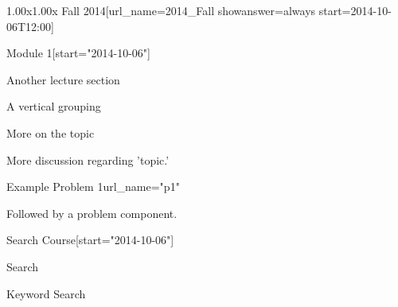 \documentclass[12pt]{article}
\begin{document}
\begin{edXcourse}{1.00x}{1.00x Fall 2014}[url_name=2014_Fall showanswer=always start=2014-10-06T12:00]
\begin{edXchapter}{Module 1}[start="2014-10-06"]
\begin{edXsequential}{Another lecture section}
\begin{edXvertical}{A vertical grouping}
\begin{edXtext}{More on the topic}

More discussion regarding 'topic.'

\end{edXtext}

\begin{edXproblem}{Example Problem 1}{url_name="p1"}

Followed by a problem component.

\end{edXproblem}

\end{edXvertical}

\end{edXsequential}

\end{edXchapter}

\begin{edXchapter}{Search Course}[start="2014-10-06"]

\begin{edXsequential}{Search}

\begin{edXtext}{Keyword Search}


\end{edXtext}
\end{edXsequential}
\end{edXchapter}
\end{edXcourse}
\end{document}
